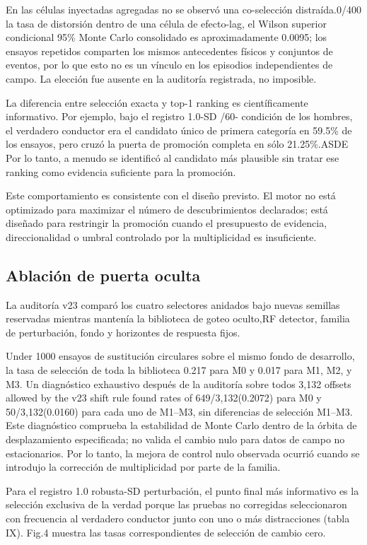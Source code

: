 \documentclass{ieeeaccess}
\begin{document}
En las células inyectadas agregadas no se observó una co-selección distraída.0/400 la tasa de distorsión dentro de una célula de efecto-lag, el Wilson superior condicional 95\% Monte Carlo consolidado es aproximadamente 0.0095; los ensayos repetidos comparten los mismos antecedentes físicos y conjuntos de eventos, por lo que esto no es un vínculo en los episodios independientes de campo. La elección fue ausente en la auditoría registrada, no imposible.

La diferencia entre selección exacta y top-1 ranking es científicamente informativo. Por ejemplo, bajo el registro 1.0-SD /60- condición de los hombres, el verdadero conductor era el candidato único de primera categoría en 59.5\% de los ensayos, pero cruzó la puerta de promoción completa en sólo 21.25\%.ASDE Por lo tanto, a menudo se identificó al candidato más plausible sin tratar ese ranking como evidencia suficiente para la promoción.

Este comportamiento es consistente con el diseño previsto. El motor no está optimizado para maximizar el número de descubrimientos declarados; está diseñado para restringir la promoción cuando el presupuesto de evidencia, direccionalidad o umbral controlado por la multiplicidad es insuficiente.

\subsection{Ablación de puerta oculta}\label{ablaciuxf3n-de-puerta-oculta-1}

La auditoría v23 comparó los cuatro selectores anidados bajo nuevas semillas reservadas mientras mantenía la biblioteca de goteo oculto,RF detector, familia de perturbación, fondo y horizontes de respuesta fijos.

Under 1000 ensayos de sustitución circulares sobre el mismo fondo de desarrollo, la tasa de selección de toda la biblioteca 0.217 para M0 y 0.017 para M1, M2, y M3. Un diagnóstico exhaustivo después de la auditoría sobre todos 3,132 offsets allowed by the v23 shift rule found rates of 649/3,132(0.2072) para M0 y 50/3,132(0.0160) para cada uno de M1--M3, sin diferencias de selección M1--M3. Este diagnóstico comprueba la estabilidad de Monte Carlo dentro de la órbita de desplazamiento especificada; no valida el cambio nulo para datos de campo no estacionarios. Por lo tanto, la mejora de control nulo observada ocurrió cuando se introdujo la corrección de multiplicidad por parte de la familia.

Para el registro 1.0 robusta-SD perturbación, el punto final más informativo es la selección exclusiva de la verdad porque las pruebas no corregidas seleccionaron con frecuencia al verdadero conductor junto con uno o más distracciones (tabla IX). Fig.4 muestra las tasas correspondientes de selección de cambio cero.
\end{document}
